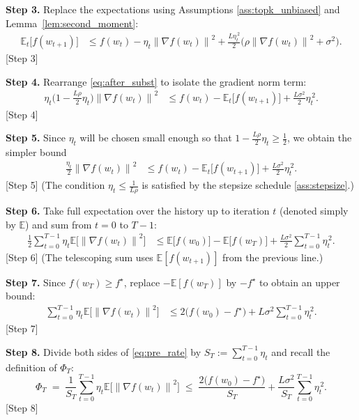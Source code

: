 \documentclass{article}
\newcommand{\EE}{\mathbb{E}}
\newcommand{\norm}[1]{\left\|#1\right\|}
\begin{document}
\noindent\textbf{Step 3.} Replace the expectations using Assumptions
\ref{ass:topk_unbiased} and Lemma~\ref{lem:second_moment}:
\begin{align}
\EE_t\!\bigl[f(w_{t+1})\bigr]
&\le f(w_t) - \eta_t\norm{\nabla f(w_t)}^2
   + \frac{L\eta_t^{\,2}}{2}\bigl(\rho\norm{\nabla f(w_t)}^2+\sigma^2\bigr).
\label{eq:after_subst}
\end{align}
[Step 3]

\noindent\textbf{Step 4.} Rearrange \eqref{eq:after_subst} to isolate the
gradient norm term:
\begin{align}
\eta_t\bigl(1-\tfrac{L\rho}{2}\eta_t\bigr)\norm{\nabla f(w_t)}^2
&\le f(w_t)-\EE_t\!\bigl[f(w_{t+1})\bigr]
   + \frac{L\sigma^2}{2}\eta_t^{\,2}.
\label{eq:grad_isolation}
\end{align}
[Step 4]

\noindent\textbf{Step 5.} Since $\eta_t$ will be chosen small enough so that
$1-\frac{L\rho}{2}\eta_t\ge \frac12$, we obtain the simpler bound
\begin{align}
\frac{\eta_t}{2}\norm{\nabla f(w_t)}^2
&\le f(w_t)-\EE_t\!\bigl[f(w_{t+1})\bigr]
   + \frac{L\sigma^2}{2}\eta_t^{\,2}.
\label{eq:simplified}
\end{align}
[Step 5] (The condition $\eta_t\le\frac{1}{L\rho}$ is satisfied by the
stepsize schedule \ref{ass:stepsize}.)

\noindent\textbf{Step 6.} Take full expectation over the history up to iteration
$t$ (denoted simply by $\EE$) and sum from $t=0$ to $T-1$:
\begin{align}
\frac12\sum_{t=0}^{T-1}\eta_t\EE\!\bigl[\norm{\nabla f(w_t)}^2\bigr]
&\le \EE\!\bigl[f(w_0)\bigr]-\EE\!\bigl[f(w_T)\bigr]
   + \frac{L\sigma^2}{2}\sum_{t=0}^{T-1}\eta_t^{\,2}.
\label{eq:telescoping}
\end{align}
[Step 6] (The telescoping sum uses $\EE[f(w_{t+1})]$ from the previous line.)

\noindent\textbf{Step 7.} Since $f(w_T)\ge f^\star$, replace $-\EE[f(w_T)]$ by
$-f^\star$ to obtain an upper bound:
\begin{align}
\sum_{t=0}^{T-1}\eta_t\EE\!\bigl[\norm{\nabla f(w_t)}^2\bigr]
&\le 2\bigl(f(w_0)-f^\star\bigr)
   + L\sigma^2\sum_{t=0}^{T-1}\eta_t^{\,2}.
\label{eq:pre_rate}
\end{align}
[Step 7]

\noindent\textbf{Step 8.} Divide both sides of \eqref{eq:pre_rate} by
$S_T:=\sum_{t=0}^{T-1}\eta_t$ and recall the definition of $\Phi_T$:
\[
\Phi_T
\;=\;
\frac{1}{S_T}\sum_{t=0}^{T-1}\eta_t\EE\!\bigl[\norm{\nabla f(w_t)}^2\bigr]
\;\le\;
\frac{2\bigl(f(w_0)-f^\star\bigr)}{S_T}
   + \frac{L\sigma^2}{S_T}\sum_{t=0}^{T-1}\eta_t^{\,2}.
\]
[Step 8]
\end{document}
